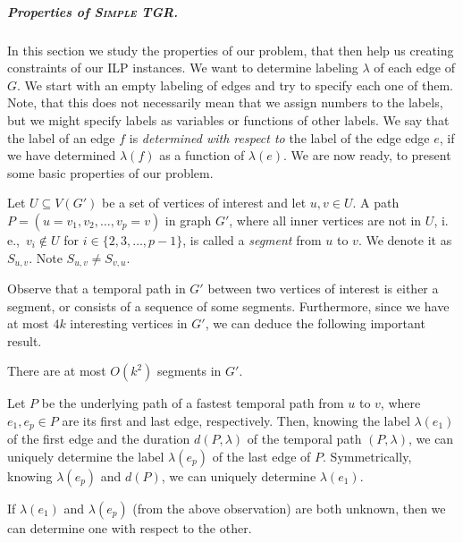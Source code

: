 \documentclass[a4paper,UKenglish,cleveref, autoref, thm-restate,anonymous]{lipics-v2021}
\newcommand{\ie}{i.\,e.,\ }
\newcommand{\deltaExact}{\textsc{Simple TGR}}
\begin{document}
\subparagraph{Properties of \deltaExact.}

In this section we study the properties of our problem, that then help us creating constraints of our ILP instances.
	We want to determine labeling $\lambda$ of each edge of $G$.
	We start with an empty labeling of edges and try to specify each one of them.
	Note, that this does not necessarily mean that we assign numbers to the labels, but we might specify labels as variables or functions of other labels.
    We say that the label of an edge $f$ is \emph{determined with respect to} the label of the edge edge $e$, if we have determined $\lambda(f)$ as a function of $\lambda(e)$. 
    We are now ready, to present some basic properties of our problem.
\begin{definition}
    Let $U \subseteq V(G')$ be a set of vertices of interest and let $u,v \in U$.
    A path $P = (u=v_1,v_2, \dots, v_p = v)$  in graph $G'$, where all inner vertices are not in $U$, \ie $v_i \notin U$ for $i \in \{ 2, 3, \dots, p-1\}$,
    is called a \emph{segment} from $u$ to $v$. We denote it as $S_{u,v}$.
    Note $S_{u,v} \neq S_{v,u}$.
\end{definition}
Observe that a temporal path in $G'$ between two vertices of interest is either a segment, or consists of a sequence of some segments. Furthermore, since we have at most $4k$ interesting vertices in $G'$, we can deduce the following important result.
\begin{corollary}\label{obs:FPT-k2segments}
    There are at most $O(k^2)$ segments in $G'$.
\end{corollary}

	\begin{observation}[$\star$]\label{obs:FirstLabelAndDuration}
		Let $P$ be the underlying path of a fastest temporal path from $u$ to $v$, where $e_1, e_p \in P$ are its first and last edge, respectively.
		Then, knowing the label $\lambda (e_1)$ of the first edge and the duration $d(P,\lambda)$ of the temporal path $(P,\lambda)$, we can uniquely determine the label $\lambda (e_p)$ of the last edge of $P$.
		Symmetrically, knowing $\lambda(e_p)$ and $d(P)$, we can uniquely determine $\lambda(e_1)$.
	\end{observation}
 If $\lambda(e_1)$ and $\lambda(e_p)$ (from the above observation) are both unknown, then we can determine one with respect to the other.
\end{document}

